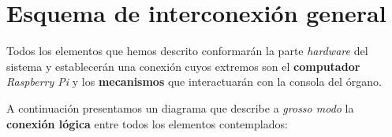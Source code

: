 \section{Esquema de interconexión general}

Todos los elementos que hemos descrito conformarán la parte \textit{hardware} del sistema y establecerán una conexión cuyos extremos son el \textbf{computador} \textit{Raspberry Pi} y los \textbf{mecanismos} que interactuarán con la consola del órgano.

A continuación presentamos un diagrama que describe a \textit{grosso modo} la \textbf{conexión lógica} entre todos los elementos contemplados:

\smallskip

\begin{figure}[H]
	\noindent \begin{centering}

\end{centering}
\end{figure}

